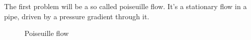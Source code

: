 The first problem will be a so called poiseuille flow.
It's a stationary flow in a pipe, driven by a pressure gradient through it.
\begin{figure}
\centering

\caption{Poiseuille flow}
\label{fig: poiseuille}
\end{figure}
